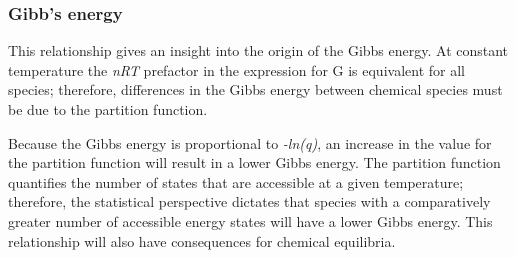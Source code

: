 \documentclass[ignorenonframetext]{beamer}
\begin{document}
\begin{frame}
\frametitle{Gibb's energy}


\end{frame}

This relationship gives an insight into the origin of the Gibbs energy. At constant temperature the \textit{nRT} prefactor in the expression for G is equivalent for all species; therefore, differences in the Gibbs energy between chemical species must be due to the partition function.

Because the Gibbs energy is proportional to \textit{-ln(q)}, an increase in the value for the partition function will result in a lower Gibbs energy. The partition function quantifies the number of states that are accessible at a given temperature; therefore, the statistical perspective dictates that species with a comparatively greater number of accessible energy states will have a lower Gibbs energy. This relationship will also have consequences for chemical equilibria.
\end{document}
